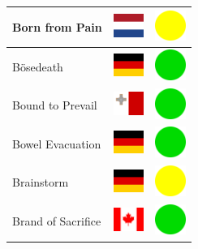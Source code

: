 \documentclass[12pt, a4paper, twoside]{report}
\begin{document}
\begin{center}
\begin{longtable}{|p{5cm}|p{2cm}|p{2cm}|}
Born from Pain & \includegraphics[width=1cm]{4x3/nl} & \includegraphics[width=1cm]{likes/m} \\ \hline
Bösedeath & \includegraphics[width=1cm]{4x3/de} & \includegraphics[width=1cm]{likes/y} \\ \hline
Bound to Prevail & \includegraphics[width=1cm]{4x3/mt} & \includegraphics[width=1cm]{likes/y} \\ \hline
Bowel Evacuation & \includegraphics[width=1cm]{4x3/de} & \includegraphics[width=1cm]{likes/y} \\ \hline
Brainstorm & \includegraphics[width=1cm]{4x3/de} & \includegraphics[width=1cm]{likes/m} \\ \hline
Brand of Sacrifice & \includegraphics[width=1cm]{4x3/ca} & \includegraphics[width=1cm]{likes/y} \\ \hline

\end{longtable}
\end{center}
\end{document}
